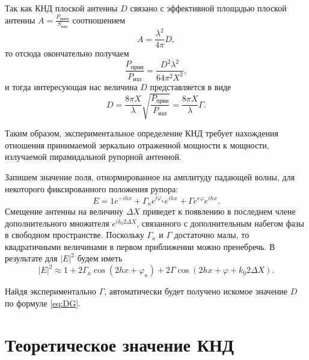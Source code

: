 \documentclass[a4paper,14pt]{extarticle}
\begin{document}
Так как КНД плоской антенны $D$ связано с эффективной площадью плоской антенны $A=\frac{P_\text{прин}}{S_\text{пад}}$ соотношением
\begin{equation}
  A=\frac{\lambda^2}{4\pi}D,
\end{equation}
то отсюда окончательно получаем
\begin{equation}
    \frac{P_\text{прин}}{P_{\text{изл}}} = \frac{D^2\lambda^2}{64\pi^2X^2},
\end{equation}
и тогда интересующая нас величина $D$ представляется в виде 
\begin{equation}
    D = \frac{8\pi X}{\lambda}\sqrt{\frac{P_\text{прин}}{P_\text{изл}}} = \frac{8 \pi X}{\lambda} \Gamma.
    \label{eq:DG}
\end{equation}

Таким образом, экспериментальное определение КНД требует нахождения отношения принимаемой зеркально отраженной мощности к мощности, излучаемой пирамидальной рупорной антенной. 


Запишем значение поля, отнормированное на амплитуду падающей волны, для некоторого фиксированного положения рупора:
\begin{equation}
    E = 1e^{-ihx}+\Gamma_\kappa e^{i\varphi_\kappa} e^{ihx}+ \Gamma e^{e\varphi} e^{ihx}.
    \label{eq:11}
\end{equation}
Смещение антенны на величину $\Delta X$ приведет к появлению в последнем члене дополнительного множителя $e^{i k_0 2\Delta X }$, связанного с дополнительным набегом фазы в свободном пространстве. 
Поскольку 
$ \Gamma_{\kappa}$ и  $\Gamma$ достаточно малы, то квадратичными величинами в первом приближении можно 
пренебречь. В результате для $ |E|^2 $ будем иметь 
\begin{equation}
    |E|^{2} \approx 1+2 \Gamma_{\kappa} \cos \left(2 h x+\varphi_{\kappa}\right)+2 \Gamma \cos \left(2 h x+\varphi+k_{0} 2 \Delta X\right).
    \label{eq:13}
\end{equation}

Найдя экспериментально $\Gamma$, автоматически будет получено искомое значение $D$ по формуле \eqref{eq:DG}.


\section{Теоретическое значение КНД}

\end{document}
